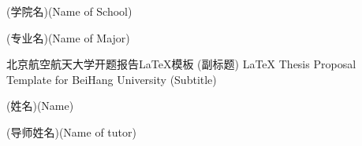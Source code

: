
\school
{(学院名)}{(Name of School)}

\major
{(专业名)}{(Name of Major)}

\thesistitle
{北京航空航天大学开题报告\LaTeX{}模板}
{(副标题)}
{\LaTeX{} Thesis Proposal Template for BeiHang University}
{(Subtitle)}

\thesisauthor
{(姓名)}{(Name)}

\teacher
{(导师姓名)}{(Name of tutor)}




